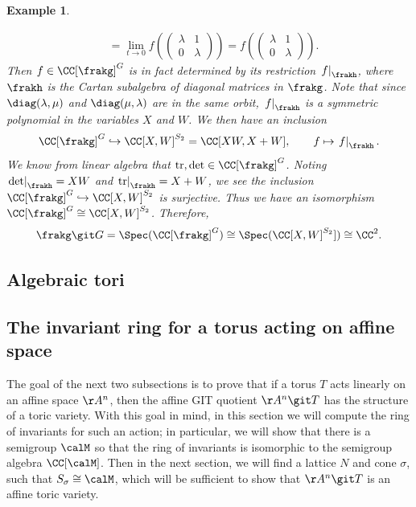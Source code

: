 \documentclass[12pt]{amsart}
\theoremstyle{plain}
\newtheorem{example}[theorem]{Example}
\begin{document}
\begin{example}
\begin{enumerate}
\begin{align*}
&= \lim_{t \to 0} f\left( \begin{pmatrix} \lambda & 1 \\ 0 & \lambda \end{pmatrix} \right) 
= f\left( \begin{pmatrix} \lambda & 1 \\ 0 & \lambda \end{pmatrix} \right).
\end{align*}
Then $f \in \CC[\frakg]^G$ is in fact determined by its restriction $\left. f \right|_{\frakh}$, where $\frakh$ is the Cartan subalgebra of diagonal matrices in $\frakg$.
Note that since $\diag(\lambda, \mu)$ and $\diag(\mu, \lambda)$ are in the same orbit, $\left. f \right|_\frakh$ is a symmetric polynomial in the variables $X$ and $W$.
We then have an inclusion
$$\CC[\frakg]^G \hookrightarrow \CC[X, W]^{S_2} = \CC[XW, X+W], \qquad f \mapsto \left. f \right|_\frakh.$$
We know from linear algebra that $\mathrm{tr}, \mathrm{det} \in \CC[\frakg]^G$.
Noting $\left. \mathrm{det} \right|_\frakh = XW$ and $\left. \mathrm{tr} \right|_\frakh = X+W$, we see the inclusion $\CC[\frakg]^G \hookrightarrow \CC[X, W]^{S_2}$ is surjective.
Thus we have an isomorphism $\CC[\frakg]^G \cong \CC[X, W]^{S_2}$.
Therefore,
$$\frakg \git G = \Spec(\CC[\frakg]^G) \cong \Spec(\CC[X, W]^{S_2}]) \cong \CC^2.$$
\end{enumerate}
\end{example}

\subsection{Algebraic tori}



\subsection{The invariant ring for a torus acting on affine space}
The goal of the next two subsections is to prove that if a torus $T$ acts linearly on an affine space $\AA^n$, then the affine GIT quotient $\AA^n \git T$ has the structure of a toric variety.
With this goal in mind, in this section we will compute the ring of invariants for such an action;
in particular, we will show that there is a semigroup $\calM$ so that the ring of invariants is isomorphic to the semigroup algebra $\CC[\calM]$.
Then in the next section, we will find a lattice $N$ and cone $\sigma$, such that $S_\sigma \cong \calM$, which will be sufficient to show that $\AA^n \git T$ is an affine toric variety.
\end{document}
